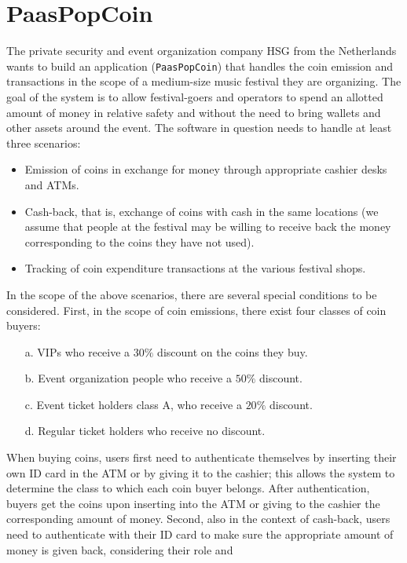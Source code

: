 \section{PaasPopCoin}

The private security and event organization company HSG from the Netherlands wants to build an application (\texttt{PaasPopCoin}) that handles the coin emission and transactions in 
the scope of a medium-size music festival they are organizing. The goal of the system is to allow festival-goers and operators to spend an allotted amount of money in 
relative safety and without the need to bring wallets and other assets around the event. The software in question needs to handle at least three scenarios:
\begin{itemize}
    \item Emission of coins in exchange for money through appropriate cashier desks and ATMs.
    \item Cash-back, that is, exchange of coins with cash in the same locations (we assume that people at the festival may be willing to receive back the money corresponding
        to the coins they have not used).
    \item Tracking of coin expenditure transactions at the various festival shops.
\end{itemize}
In the scope of the above scenarios, there are several special conditions to be considered. First, in the scope of coin emissions, there exist four classes of coin buyers: 
\begin{itemize}
    \item [a.] VIPs who receive a $30\%$ discount on the coins they buy. 
    \item [b.] Event organization people who receive a $50\%$ discount. 
    \item [c.] Event ticket holders class A, who receive a $20\%$ discount. 
    \item [d.] Regular ticket holders who receive no discount.
\end{itemize}
When buying coins, users first need to authenticate themselves by inserting their own ID card in the ATM or by giving it to the cashier; this allows the system to determine 
the class to which each coin buyer belongs. After authentication, buyers get the coins upon inserting into the ATM or giving to the cashier the corresponding amount of money.
Second, also in the context of cash-back, users need to authenticate with their ID card to make sure the appropriate amount of money is given back, considering their role and 
